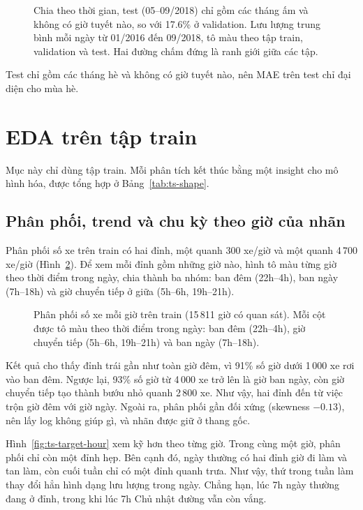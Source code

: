 \begin{figure}[H]
\centering
{}
\caption{Chia theo thời gian, test (05--09/2018) chỉ gồm các tháng ấm và không có giờ tuyết nào, so với 17.6\% ở validation. Lưu lượng
trung bình mỗi ngày từ 01/2016 đến 09/2018, tô màu theo tập train, validation và test. Hai đường chấm đứng là ranh
giới giữa các tập.}
\label{fig:ts-split}
\end{figure}

Test chỉ gồm các tháng hè và không có giờ tuyết nào, nên MAE trên test chỉ đại diện cho mùa hè.

\section{EDA trên tập train}
\label{sec:ts-eda}
Mục này chỉ dùng tập train. Mỗi phân tích kết thúc bằng một insight cho mô hình hóa, được tổng hợp ở Bảng~\ref{tab:ts-shape}.

\subsection{Phân phối, trend và chu kỳ theo giờ của nhãn}
\label{sec:ts-cycles}
\label{sec:ts-target}
Phân phối số xe trên train có hai đỉnh, một quanh 300 xe/giờ và một quanh 4\,700 xe/giờ (Hình~\ref{fig:ts-target-hist}). Để xem mỗi
đỉnh gồm những giờ nào, hình tô màu từng giờ theo thời điểm trong ngày, chia thành ba nhóm: ban đêm (22h--4h), ban ngày (7h--18h) và giờ
chuyển tiếp ở giữa (5h--6h, 19h--21h).

\begin{figure}[H]
\centering
{}
\caption{Phân phối số xe mỗi giờ trên train (15\,811 giờ có quan sát). Mỗi cột được tô màu theo thời điểm trong ngày: ban đêm
(22h--4h), giờ chuyển tiếp (5h--6h, 19h--21h) và ban ngày (7h--18h).}
\label{fig:ts-target-hist}
\end{figure}

Kết quả cho thấy đỉnh trái gần như toàn giờ đêm, vì 91\% số giờ dưới 1\,000 xe rơi vào ban đêm. Ngược lại, 93\% số giờ từ 4\,000 xe trở
lên là giờ ban ngày, còn giờ chuyển tiếp tạo thành bướu nhỏ quanh 2\,800 xe. Như vậy, hai đỉnh đến từ việc trộn giờ đêm với giờ ngày.
Ngoài ra, phân phối gần đối xứng (skewness $-0.13$), nên lấy log không giúp gì, và nhãn được giữ ở thang gốc.

Hình~\ref{fig:ts-target-hour} xem kỹ hơn theo từng giờ. Trong cùng một giờ, phân phối chỉ còn một đỉnh hẹp. Bên cạnh đó, ngày thường có
hai đỉnh giờ đi làm và tan làm, còn cuối tuần chỉ có một đỉnh quanh trưa. Như vậy, thứ trong tuần làm thay đổi hẳn hình dạng lưu lượng
trong ngày. Chẳng hạn, lúc 7h ngày thường đang ở đỉnh, trong khi lúc 7h Chủ nhật đường vẫn còn vắng.

